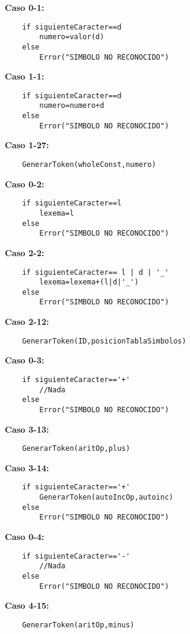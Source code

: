 \documentclass{article}
\begin{document}
\begin{center}
\textbf{Caso 0-1:}
\begin{verbatim}
    if siguienteCaracter==d
        numero=valor(d)
    else
        Error("SIMBOLO NO RECONOCIDO")
\end{verbatim}

\textbf{Caso 1-1:}
\begin{verbatim}
    if siguienteCaracter==d
        numero=numero+d
    else 
        Error("SIMBOLO NO RECONOCIDO")
\end{verbatim}

\textbf{Caso 1-27:}
\begin{verbatim}
    GenerarToken(wholeConst,numero)
\end{verbatim}

\textbf{Caso 0-2:}
\begin{verbatim}
    if siguienteCaracter==l 
        lexema=l
    else 
        Error("SIMBOLO NO RECONOCIDO")
\end{verbatim}

\textbf{Caso 2-2:}
\begin{verbatim}
    if siguienteCaracter== l | d | '_' 
        lexema=lexema+(l|d|'_')
    else 
        Error("SIMBOLO NO RECONOCIDO")
\end{verbatim}

\textbf{Caso 2-12:}
\begin{verbatim}
    GenerarToken(ID,posicionTablaSimbolos)
\end{verbatim}

\textbf{Caso 0-3:}
\begin{verbatim}
    if siguienteCaracter=='+'
        //Nada
    else
        Error("SIMBOLO NO RECONOCIDO")
\end{verbatim}

\textbf{Caso 3-13:}
\begin{verbatim}
    GenerarToken(aritOp,plus)
\end{verbatim}

\textbf{Caso 3-14:}
\begin{verbatim}
    if siguienteCaracter=='+'
        GenerarToken(autoIncOp,autoinc)
    else 
        Error("SIMBOLO NO RECONOCIDO")
\end{verbatim}

\textbf{Caso 0-4:}
\begin{verbatim}
    if siguienteCaracter=='-'
        //Nada
    else
        Error("SIMBOLO NO RECONOCIDO")
\end{verbatim}

\textbf{Caso 4-15:}
\begin{verbatim}
    GenerarToken(aritOp,minus)
\end{verbatim}


\end{center}
\end{document}
